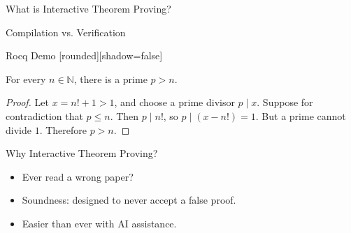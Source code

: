 \begin{frame}{What is Interactive Theorem Proving?}
  \begin{center}
  \end{center}
\end{frame}

\begin{frame}{Compilation vs. Verification}
  \begin{center}
  \end{center}
\end{frame}

\begin{frame}{Rocq Demo}
[rounded][shadow=false]
\small
\begin{theorem}
    For every $n\in\mathbb N$, there is a prime $p>n$.
\end{theorem}
\pause
\begin{proof}
    Let $x=n!+1>1$, and choose a prime divisor $p\mid x$.
    Suppose for contradiction that $p\leq n$.
    Then $p\mid n!$, so $p\mid(x-n!)=1$.
    But a prime cannot divide $1$. Therefore $p>n$.
\end{proof}
\end{frame}

\begin{frame}{Why Interactive Theorem Proving?}
\begin{itemize}[<+->]
\item Ever read a wrong paper?
\item Soundness: designed to never accept a false proof.
\item Easier than ever with AI assistance.
\end{itemize}
\end{frame}

